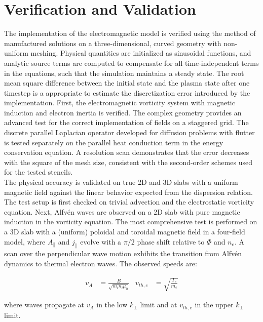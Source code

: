 \chapter{Verification and Validation}
\label{chap:VV}


\begin{chaptersummarybox}
	The implementation of the electromagnetic model is verified using the method of manufactured solutions on a three-dimensional, curved geometry with non-uniform meshing. Physical quantities are initialized as sinusoidal functions, and analytic source terms are computed to compensate for all time-independent terms in the equations, such that the simulation maintains a steady state. The root mean square difference between the initial state and the plasma state after one timestep is a appropriate to estimate the discretization error introduced by the implementation. First, the electromagnetic vorticity system with magnetic induction and electron inertia is verified. The complex geometry provides an advanced test for the correct implementation of fields on a staggered grid. The discrete parallel Laplacian operator developed for diffusion problems with flutter is tested separately on the parallel heat conduction term in the energy conservation equation. A resolution scan demonstrates that the error decreases with the square of the mesh size, consistent with the second-order schemes used for the tested stencils. \\
	
	The physical accuracy is validated on true 2D and 3D slabs with a uniform magnetic field against the linear behavior expected from the dispersion relation. The test setup is first checked on trivial advection and the electrostatic vorticity equation. Next, Alfvén waves are observed on a 2D slab with pure magnetic induction in the vorticity equation. The most comprehensive test is performed on a 3D slab with a (uniform) poloidal and toroidal magnetic field in a four-field model, where $A_\parallel$ and $j_\parallel$ evolve with a $\pi/2$ phase shift relative to $\Phi$ and $n_e$. A scan over the perpendicular wave motion exhibits the transition from Alfvén dynamics to thermal electron waves. The observed speeds are:
	
	\begin{align*}
		v_A &= \frac{B}{\sqrt{m_in_i\mu_0}} & v_{th,e} &= \sqrt{\frac{T_e}{m_e}}
	\end{align*} 
	
	where waves propagate at $v_A$ in the low $k_\perp$ limit and at $v_{th,e}$ in the upper $k_\perp$ limit.
	
\end{chaptersummarybox}

